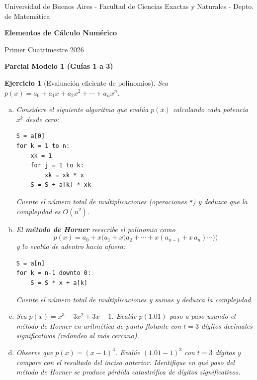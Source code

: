 \documentclass[12pt]{article}
\newtheorem{exercise}{Ejercicio}
\begin{document}
\centerline{{\small Universidad de Buenos Aires - Facultad de Ciencias Exactas y Naturales - Depto. de Matemática}}
 
 \vskip 0.2cm
 \hrulefill
 \vskip 0.2cm

 \centerline{{\bf\Huge {\sc Elementos de Cálculo Numérico}}}
 \vskip 0.2cm
 \centerline{\ttfamily Primer Cuatrimestre 2026}
 \hrulefill

 \bigskip
 \centerline{\bf Parcial Modelo 1 (Guías 1 a 3)}
 \bigskip


\begin{exercise}[Evaluación eficiente de polinomios]
Sea $p(x) = a_0 + a_1 x + a_2 x^2 + \cdots + a_n x^n$.

\begin{enumerate}[(a)]
\item Considere el siguiente algoritmo que evalúa $p(x)$ calculando cada potencia $x^k$ desde cero:
\begin{verbatim}
S = a[0]
for k = 1 to n:
    xk = 1
    for j = 1 to k:
        xk = xk * x
    S = S + a[k] * xk
\end{verbatim}
Cuente el número total de multiplicaciones (operaciones \texttt{*}) y deduzca que la complejidad es $O(n^2)$.

\item El \textbf{método de Horner} reescribe el polinomio como
\[
p(x) = a_0 + x\bigl(a_1 + x\bigl(a_2 + \cdots + x(a_{n-1} + x\,a_n)\cdots\bigr)\bigr)
\]
y lo evalúa de adentro hacia afuera:
\begin{verbatim}
S = a[n]
for k = n-1 downto 0:
    S = S * x + a[k]
\end{verbatim}
Cuente el número total de multiplicaciones y sumas y deduzca la complejidad.

\item Sea $p(x) = x^3 - 3x^2 + 3x - 1$. Evalúe $p(1.01)$ paso a paso usando el método de Horner en aritmética de punto flotante con $t = 3$ dígitos decimales significativos (redondeo al más cercano).

\item Observe que $p(x) = (x-1)^3$. Evalúe $(1.01 - 1)^3$ con $t = 3$ dígitos y compare con el resultado del inciso anterior. Identifique en qué paso del método de Horner se produce pérdida catastrófica de dígitos significativos.
\end{enumerate}
\end{exercise}
\end{document}
